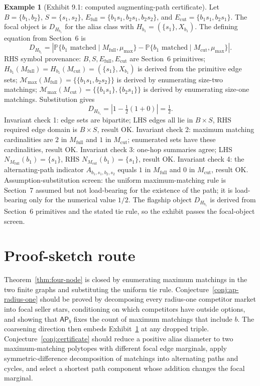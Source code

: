 \documentclass[11pt]{article}
\renewcommand{\Pr}{\mathbb{P}}
\theoremstyle{definition}
\newtheorem{example}{Example}
\theoremstyle{plain}
\theoremstyle{remark}
\begin{document}
\begin{example}[Exhibit 9.1: computed augmenting-path certificate]\label{ex:four-node}
Let \(B=\{b_1,b_2\}\), \(S=\{s_1,s_2\}\), \(E_{\mathrm{full}}=\{b_1s_1,b_2s_1,b_2s_2\}\), and \(E_{\mathrm{cut}}=\{b_1s_1,b_2s_1\}\).  The focal object is \(D_{H_{b_1}}\) for the alias class with \(H_{b_1}=(\{s_1\},X_{b_1})\).  The defining equation from Section~6 is
\[
D_{H_{b_1}}=\left|\Pr\{b_1\text{ matched}\mid M_{\mathrm{full}},\mu_{\max}\}-
\Pr\{b_1\text{ matched}\mid M_{\mathrm{cut}},\mu_{\max}\}\right|.
\]
RHS symbol provenance: \(B,S,E_{\mathrm{full}},E_{\mathrm{cut}}\) are Section~6 primitives; \(H_{b_1}(M_{\mathrm{full}})=H_{b_1}(M_{\mathrm{cut}})=(\{s_1\},X_{b_1})\) is derived from the primitive edge sets; \(\mathcal M_{\max}(M_{\mathrm{full}})=\{\{b_1s_1,b_2s_2\}\}\) is derived by enumerating size-two matchings; \(\mathcal M_{\max}(M_{\mathrm{cut}})=\{\{b_1s_1\},\{b_2s_1\}\}\) is derived by enumerating size-one matchings.  Substitution gives
\[
D_{H_{b_1}}=|1-\tfrac12(1+0)|=\tfrac12.
\]
Invariant check 1: edge sets are bipartite; LHS edges all lie in \(B\times S\), RHS required edge domain is \(B\times S\), result OK.  Invariant check 2: maximum matching cardinalities are \(2\) in \(M_{\mathrm{full}}\) and \(1\) in \(M_{\mathrm{cut}}\); enumerated sets have these cardinalities, result OK.  Invariant check 3: one-hop summaries agree; LHS \(N_{M_{\mathrm{full}}}(b_1)=\{s_1\}\), RHS \(N_{M_{\mathrm{cut}}}(b_1)=\{s_1\}\), result OK.  Invariant check 4: the alternating-path indicator \(A_{b_1,s_1,b_2,s_2}\) equals \(1\) in \(M_{\mathrm{full}}\) and \(0\) in \(M_{\mathrm{cut}}\), result OK.  Assumption-substitution screen: the uniform maximum-matching rule is Section~7 assumed but not load-bearing for the existence of the path; it is load-bearing only for the numerical value \(1/2\).  The flagship object \(D_{H_{b_1}}\) is derived from Section~6 primitives and the stated tie rule, so the exhibit passes the focal-object screen.
\end{example}

\section{Proof-sketch route}
Theorem~\ref{thm:four-node} is closed by enumerating maximum matchings in the two finite graphs and substituting the uniform tie rule.  Conjecture~\ref{conj:ap-radius-one} should be proved by decomposing every radius-one competitor market into focal seller stars, conditioning on which competitors have outside options, and showing that \(\mathsf{AP}_b\) fixes the count of maximum matchings that include \(b\).  The coarsening direction then embeds Exhibit~\ref{ex:four-node} at any dropped triple.  Conjecture~\ref{conj:certificate} should reduce a positive alias diameter to two maximum-matching polytopes with different focal edge marginals, apply symmetric-difference decomposition of matchings into alternating paths and cycles, and select a shortest path component whose addition changes the focal marginal.
\end{document}
